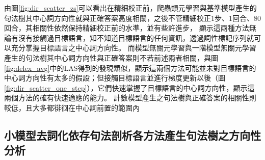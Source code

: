 由圖\ref{fig:dir_scatter_zs}可以看出在精細校正前，爬蟲類元學習與基準模型產生的句法樹其中心詞方向性就與正確答案高度相關，之後不管精細校正1步、1回合、80回合，其相關性依然保持精細校正前的水準，並有些許進步，
顯示這兩種方法無論有沒有接觸過目標語言，知不知道目標語言的任何資訊，透過詞性標記序列就可以充分掌握目標語言之中心詞方向性。
而模型無關元學習與一階模型無關元學習產生的句法樹其中心詞方向性與正確答案則不若前述兩者相關，與圖\ref{fig:delex_avg}中的LAS得到的發現類似，顯示這兩個方法可能並未對目標語言的中心詞方向性有太多的假設；但接觸目標語言並進行梯度更新以後（圖\ref{fig:dir_scatter_one_step}），它們快速掌握了目標語言的中心詞方向性，顯示這兩個方法的確有快速適應的能力。
計數模型產生之句法樹與正確答案的相關性則較低，且大多都徘徊在中心詞前置的範圍內

\subsection{小模型去詞化依存句法剖析各方法產生句法樹之方向性分析}



\iffalse




\fi
